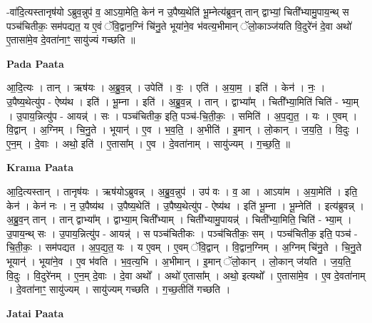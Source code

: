 \documentclass[17pt]{extarticle}
\begin{document}
-वा॑दि॒त्यस्तानृष॑यो ऽब्रुव॒न्नुप॑ व॒ आऽया॒मेति॒ केन॑ न उ॒पैष्य॒थेति॑ भू॒म्नेत्य॑ब्रुव॒न् तान् द्वाभ्यां॒ चिती᳚भ्यामु॒पाय॒न्थ् स पञ्च॑चितीकः॒ सम॑पद्यत॒ य ए॒वं ॅवि॒द्वान॒ग्निं चि॑नु॒ते भूया॑ने॒व भ॑वत्य॒भीमान् ॅलो॒काञ्ज॑यति वि॒दुरे॑नं दे॒वा अथो॑ ए॒तासा॑मे॒व दे॒वता॑नाꣳ॒॒ सायु॑ज्यं गच्छति ॥ \newline

\textbf{Pada Paata} \newline

आ॒दि॒त्यः । तान् । ऋष॑यः । अ॒ब्रु॒व॒न्न् । उपेति॑ । वः॒ । एति॑ । अ॒या॒म॒ । इति॑ । केन॑ । नः॒ । उ॒पैष्य॒थेत्यु॑प - ऐष्य॑थ । इति॑ । भू॒म्ना । इति॑ । अ॒ब्रु॒व॒न्न् । तान् । द्वाभ्या᳚म् । चिती᳚भ्या॒मिति॑ चिति॑ - भ्या॒म् । उ॒पाय॒न्नित्यु॑प - आयन्न्॑ । सः । पञ्च॑चितीक॒ इति॒ पञ्च॑-चि॒ती॒कः॒ । समिति॑ । अ॒प॒द्य॒त॒ । यः । ए॒वम् । वि॒द्वान् । अ॒ग्निम् । चि॒नु॒ते । भूयान्॑ । ए॒व । भ॒व॒ति॒ । अ॒भीति॑ । इ॒मान् । लो॒कान् । ज॒य॒ति॒ । वि॒दुः । ए॒न॒म् । दे॒वाः । अथो॒ इति॑ । ए॒तासा᳚म् । ए॒व । दे॒वता॑नाम् । सायु॑ज्यम् । ग॒च्छ॒ति॒ ॥  \newline


\textbf{Krama Paata} \newline

आ॒दि॒त्यस्तान् । तानृष॑यः । ऋष॑योऽब्रुवन्न् । अ॒ब्रु॒व॒न्नुप॑ । उप॑ वः । व॒ आ । आऽया॑म । अ॒या॒मेति॑ । इति॒ केन॑ । केन॑ नः । न॒ उ॒पैष्य॑थ । उ॒पैष्य॒थेति॑ । उ॒पैष्य॒थेत्यु॑प - ऐष्य॑थ । इति॑ भू॒म्ना । भू॒म्नेति॑ । इत्य॑ब्रुवन्न् । अ॒ब्रु॒व॒न् तान् । तान् द्वाभ्या᳚म् । द्वाभ्या॒म् चिती᳚भ्याम् । चिती᳚भ्यामु॒पायन्न्॑ । चिती᳚भ्या॒मिति॒ चिति॑ - भ्या॒म् । उ॒पाय॒न्थ् सः । उ॒पाय॒न्नित्यु॑प - आयन्न्॑ । स पञ्च॑चितीकः । पञ्च॑चितीकः॒ सम् । पञ्च॑चितीक॒ इति॒ पञ्च॑ - चि॒ती॒कः॒ । सम॑पद्यत । अ॒प॒द्य॒त॒ यः । य ए॒वम् । ए॒वम् ॅवि॒द्वान् । वि॒द्वान॒ग्निम् । अ॒ग्निम् चि॑नु॒ते । चि॒नु॒ते भूयान्॑ । भूया॑ने॒व । ए॒व भ॑वति । भ॒व॒त्य॒भि । अ॒भीमान् । इ॒मान् ॅलो॒कान् । लो॒कान् ज॑यति । ज॒य॒ति॒ वि॒दुः । वि॒दुरे॑नम् । ए॒न॒म् दे॒वाः । दे॒वा अथो᳚ । अथो॑ ए॒तासा᳚म् । अथो॒ इत्यथो᳚ । ए॒तासा॑मे॒व । ए॒व दे॒वता॑नाम् । दे॒वता॑नाꣳ॒॒ सायु॑ज्यम् । सायु॑ज्यम् गच्छति । ग॒च्छ॒तीति॑ गच्छति । \newline

\textbf{Jatai Paata} \newline
\end{document}
